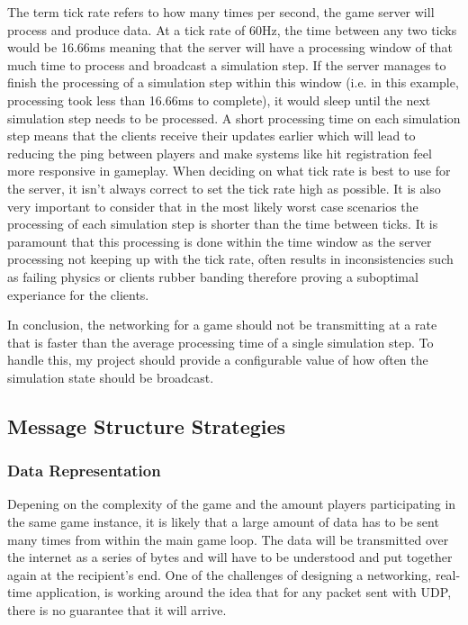 The term tick rate refers to how many times per second, the game server will process and produce data. At a tick rate of 60Hz, the time between any two ticks would be 16.66ms meaning that the server will have a processing window of that much time to process and broadcast a simulation step. If the server manages to finish the processing of a simulation step within this window (i.e. in this example, processing took less than 16.66ms to complete), it would sleep until the next simulation step needs to be processed. A short processing time on each simulation step means that the clients receive their updates earlier which will lead to reducing the ping between players and make systems like hit registration feel more responsive in gameplay. When deciding on what tick rate is best to use for the server, it isn't always correct to set the tick rate high as possible. It is also very important to consider that in the most likely worst case scenarios the processing of each simulation step is shorter than the time between ticks. It is paramount that this processing is done within the time window as the server processing not keeping up with the tick rate, often results in inconsistencies such as failing physics or clients rubber banding therefore proving a suboptimal experiance for the clients.

In conclusion, the networking for a game should not be transmitting at a rate that is faster than the average processing time of a single simulation step. To handle this, my project should provide a configurable value of how often the simulation state should be broadcast.


\subsection{Message Structure Strategies}

\subsubsection{Data Representation}
Depening on the complexity of the game and the amount players participating in the same game instance, it is likely that a large amount of data has to be sent many times from within the main game loop. The data will be transmitted over the internet as a series of bytes and will have to be understood and put together again at the recipient's end. One of the challenges of designing a networking, real-time application, is working around the idea that for any packet sent with UDP, there is no guarantee that it will arrive.


